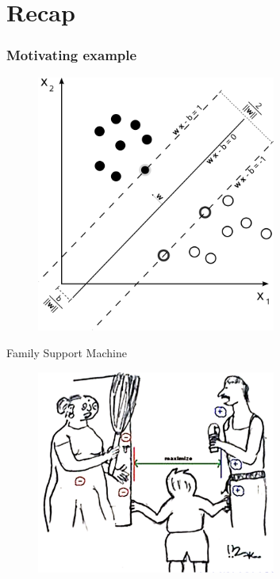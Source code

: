 \section{Recap}
\begin{frame}[fragile]
    \frametitle{Motivating example}
    \begin{figure}[htbp]
        \centering
        \includegraphics[height=0.8\textheight, width=0.7\textwidth]{images/svm_ex.png}
    \end{figure}
\end{frame}

\begin{frame}{Family Support Machine}
    \begin{figure}[htbp]
        \centering
        \includegraphics[height=0.7\textheight, width=0.7\textwidth]{images/family.png}
    \end{figure}
\end{frame}

